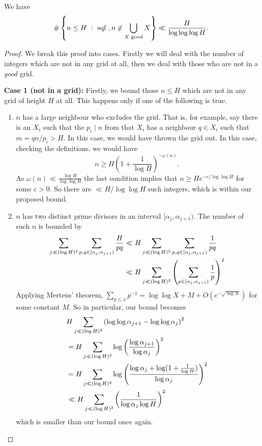 \documentclass{lecturenotes}
\numberwithin{equation}{section}
\begin{document}
\begin{theorem}\label{thm:restrict to good grids} We have
    \[\#\left\{{n\leq H~:~\textnormal{sqf },n\not\in \bigcup\limits_{X\textnormal{ good}}X}\right\}\ll \frac{H}{\log\log\log H}.\]
\end{theorem}
\begin{proof}
We break this proof into cases.  Firstly we will deal with the number of integers which are not in any grid at all, then we deal with those who are not in a \emph{good} grid.

    \textbf{Case 1 (not in a grid):}    Firstly, we bound those $n\leq H$ which are not in any grid of height $H$ at all.  This happens only if one of the following is true.
    \begin{enumerate}
        \item $n$ has a large neighbour who excludes the grid.  That is, for example, say there is an $X_i$ such that the $p_i\mid n$ from that $X_i$ has a neighbour $q\in X_i$ such that $m=qn/p_i>H$.  In this case, we would have thrown the grid out.  In this case, checking the definitions, we would have
        \[n\geq H(1+\frac{1}{\log H})^{-\omega(n)}.\]
        As $\omega(n)\ll \frac{\log H}{\log \log H}$ the last condition implies that $n\geq He^{-c/\log\log H}$ for some $c>0$. So there are $\ll H/\log \log H$ such integers, which is within our proposed bound.
        \item $n$ has two distinct prime divisors in an interval $[\alpha_j,\alpha_{j+1})$.  The number of such $n$ is bounded by
    \begin{align*}
        \sum_{j\ll (\log H)^2}\sum_{p,q\in [\alpha_j,\alpha_{j+1})}
        \frac{H}{pq}
        &\ll H\sum_{j\ll (\log H)^2}\sum_{p,q\in [\alpha_j,\alpha_{j+1})}
        \frac{1}{pq}\\
        &\ll H\sum_{j\ll (\log H)^2}\left({\sum_{p\in [\alpha_j,\alpha_{j+1})}\frac{1}{p}}\right)^2
    \end{align*}
    Applying Mertens' theorem, $\sum_{p\leq x}p^{-1}=\log\log X+M+O(e^{-\sqrt{\log X}})$ for some constant $M$.  So in particular, our bound becomes
    \begin{align*}
        &H\sum_{j\ll (\log H)^2}\left({\log\log \alpha_{j+1}-\log\log \alpha_j}\right)^2
        \\&=
        H\sum_{j\ll (\log H)^2}\log\left({\frac{\log \alpha_{j+1}}{\log\alpha_j}}\right)^2\\
        &=
        H\sum_{j\ll (\log H)^2}\log\left({\frac{\log \alpha_{j}+\log(1+\frac{1}{\log H})}{\log\alpha_j}}\right)^2\\
        &\ll H\sum_{j\ll (\log H)^2}\left({\frac{1}{\log\alpha_j \log H}}\right)^2\\
    \end{align*}
    which is smaller than our bound once again.


\end{enumerate}
\end{proof}
\end{document}

